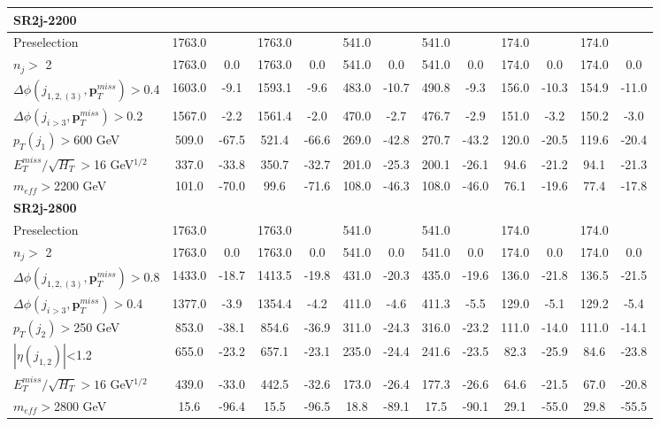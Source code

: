 \documentclass[a4paper,11pt]{article}
\begin{document}
\begin{landscape}
\begin{table}[h]
\begin{tabular}{ | l | c c c c  || c c c c || c c c c | }
\multicolumn{13}{|l|}{\textbf{SR2j-2200}} \\ \hline
Preselection&1763.0&&1763.0&&541.0&&541.0&&174.0&&174.0&
\\
$n_j>$ 2&1763.0&0.0&1763.0&0.0&541.0&0.0&541.0&0.0&174.0&0.0&174.0&0.0
\\
$\Delta \phi(j_{1,2,(3)},\mathbf{p}_T^{miss})>$0.4&1603.0&-9.1&1593.1&-9.6&483.0&-10.7&490.8&-9.3&156.0&-10.3&154.9&-11.0
\\
$\Delta \phi(j_{i>3},\mathbf{p}_T^{miss})>$0.2&1567.0&-2.2&1561.4&-2.0&470.0&-2.7&476.7&-2.9&151.0&-3.2&150.2&-3.0
\\
$p_T(j_1)>$600 GeV&509.0&-67.5&521.4&-66.6&269.0&-42.8&270.7&-43.2&120.0&-20.5&119.6&-20.4
\\
$E_T^{miss}/\sqrt{H_T}>$16 GeV$^{1/2}$&337.0&-33.8&350.7&-32.7&201.0&-25.3&200.1&-26.1&94.6&-21.2&94.1&-21.3
\\
$m_{eff}>$2200 GeV&101.0&-70.0&99.6&-71.6&108.0&-46.3&108.0&-46.0&76.1&-19.6&77.4&-17.8
\\ \hline
\multicolumn{13}{|l|}{\textbf{SR2j-2800}} \\ \hline
Preselection&1763.0&&1763.0&&541.0&&541.0&&174.0&&174.0&
\\
$n_j>$ 2&1763.0&0.0&1763.0&0.0&541.0&0.0&541.0&0.0&174.0&0.0&174.0&0.0
\\
$\Delta \phi(j_{1,2,(3)},\mathbf{p}_T^{miss})>$0.8&1433.0&-18.7&1413.5&-19.8&431.0&-20.3&435.0&-19.6&136.0&-21.8&136.5&-21.5
\\
$\Delta \phi(j_{i>3},\mathbf{p}_T^{miss})>$0.4&1377.0&-3.9&1354.4&-4.2&411.0&-4.6&411.3&-5.5&129.0&-5.1&129.2&-5.4
\\
$p_T(j_2)>$250 GeV &853.0&-38.1&854.6&-36.9&311.0&-24.3&316.0&-23.2&111.0&-14.0&111.0&-14.1
\\
$|\eta(j_{1,2})|$<1.2&655.0&-23.2&657.1&-23.1&235.0&-24.4&241.6&-23.5&82.3&-25.9&84.6 &-23.8
\\
$E_T^{miss}/\sqrt{H_T}>16 $ GeV$^{1/2}$&439.0&-33.0&442.5&-32.6&173.0&-26.4&177.3&-26.6&64.6&-21.5&67.0&-20.8
\\
$m_{eff}>$2800 GeV&15.6&-96.4&15.5&-96.5&18.8&-89.1&17.5&-90.1&29.1&-55.0&29.8&-55.5
\\





			\bottomrule \bottomrule
		\end{tabular}

\end{table}	
		
		\end{landscape}
	
\end{document}
